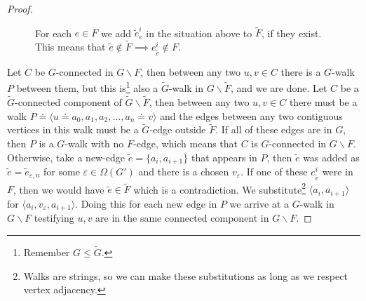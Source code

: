 \documentclass[10pt]{article}
\numberwithin{equation}{subsection}
\theoremstyle{remark}
\begin{document}
\begin{proof}
\begin{figure}[ht!]
\begin{minipage}{0.5\textwidth}
    \end{minipage}
    \caption{For each $e \in F$ we add $\tilde{e}_{e}^i$ in the situation above to $\tilde{F}$, if they exist. This means that $\tilde{e} \notin \tilde{F}\implies e_{\tilde{e}}^i \notin F$.}
    \label{edgefigure}
    \end{figure}

    Let $C$ be $G$-connected in $G \backslash F$, then between any two $u,v \in C$ there is a $G$-walk $P$ between them, but this is\footnote{Remember $G \leq \tilde{G}$.} also a $\tilde{G}$-walk in $G \backslash \tilde{F}$, and we are done. Let $C$ be a $\tilde{G}$-connected component of $\tilde{G} \backslash \tilde{F}$, then between any two $u,v \in C$ there must be a walk $P \doteq \langle u \doteq a_0,a_1,a_2,\dots,a_n \doteq v \rangle$ and the edges between any two contiguous vertices in this walk must be a $\tilde{G}$-edge outside $\tilde{F}$. If all of these edges are in $G$, then $P$ is a $G$-walk with no $F$-edge, which means that $C$ is $G$-connected in $G \backslash F$. Otherwise, take a new-edge $\tilde{e} = \{a_i,a_{i+1}\}$ that appears in $P$, then $\tilde{e}$ was added as $\tilde{e} = \tilde{e}_{\varepsilon,n}$ for some $\varepsilon \in \Omega(G')$ and there is a chosen $v_\varepsilon$. If one of these $e_{\tilde{e}}^i$ were in $F$, then we would have $\tilde{e} \in \tilde{F}$ which is a contradiction. We substitute\footnote{Walks are strings, so we can make these substitutions as long as we respect vertex adjacency.} $\langle a_i,a_{i+1} \rangle$ for $\langle a_i,v_\varepsilon,a_{i+1}\rangle$. Doing this for each new edge in $P$ we arrive at a $G$-walk in $G\backslash F$ testifying $u,v$ are in the same connected component in $G \backslash F$.
\end{proof}
\fi
\end{document}
